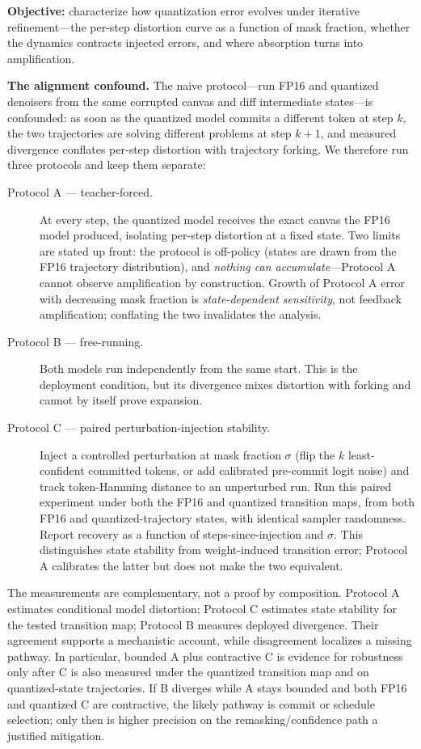 \documentclass[11pt]{article}
\begin{document}
\textbf{Objective:} characterize how quantization error evolves under iterative refinement---the per-step distortion curve as a function of mask fraction, whether the dynamics contracts injected errors, and where absorption turns into amplification.

\textbf{The alignment confound.} The naive protocol---run FP16 and quantized denoisers from the same corrupted canvas and diff intermediate states---is confounded: as soon as the quantized model commits a different token at step $k$, the two trajectories are solving different problems at step $k{+}1$, and measured divergence conflates per-step distortion with trajectory forking. We therefore run three protocols and keep them separate:

\begin{description}
\item[Protocol A --- teacher-forced.] At every step, the quantized model receives the exact canvas the FP16 model produced, isolating per-step distortion at a fixed state. Two limits are stated up front: the protocol is off-policy (states are drawn from the FP16 trajectory distribution), and \emph{nothing can accumulate}---Protocol A cannot observe amplification by construction. Growth of Protocol A error with decreasing mask fraction is \emph{state-dependent sensitivity}, not feedback amplification; conflating the two invalidates the analysis.
\item[Protocol B --- free-running.] Both models run independently from the same start. This is the deployment condition, but its divergence mixes distortion with forking and cannot by itself prove expansion.
\item[Protocol C --- paired perturbation-injection stability.] Inject a controlled perturbation at mask fraction $\sigma$ (flip the $k$ least-confident committed tokens, or add calibrated pre-commit logit noise) and track token-Hamming distance to an unperturbed run. Run this paired experiment under both the FP16 and quantized transition maps, from both FP16 and quantized-trajectory states, with identical sampler randomness. Report recovery as a function of steps-since-injection and $\sigma$. This distinguishes state stability from weight-induced transition error; Protocol A calibrates the latter but does not make the two equivalent.
\end{description}

The measurements are complementary, not a proof by composition. Protocol A estimates conditional model distortion; Protocol C estimates state stability for the tested transition map; Protocol B measures deployed divergence. Their agreement supports a mechanistic account, while disagreement localizes a missing pathway. In particular, bounded A plus contractive C is evidence for robustness only after C is also measured under the quantized transition map and on quantized-state trajectories. If B diverges while A stays bounded and both FP16 and quantized C are contractive, the likely pathway is commit or schedule selection; only then is higher precision on the remasking/confidence path a justified mitigation.
\end{document}
